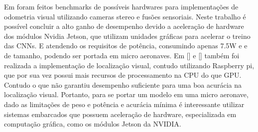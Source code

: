 Em \cite{jeon2021run} foram feitos benchmarks de possíveis hardwares para implementações de odometria visual utilizando cameras stereo e fusões sensoriais. Neste trabalho é possível concluir a alto ganho de desempenho devido a aceleração de hardware dos módulos Nvidia Jetson, que utilizam unidades gráficas para acelerar o treino das CNNs. E atendendo os requisitos de potência, consumindo apenas 7.5W e e de tamanho, podendo ser portada em micro aeronaves.  Em [] e [] também foi realizada a implementação de localização visual, contudo utilizando Raspberry pi, que por sua vez possui mais recursos de processamento na CPU do que GPU. Contudo  o que não garantiu desempenho suficiente para uma boa acurácia na localização visual. Portanto, para se portar um modelo em uma micro aeronave, dado as limitações de peso e potência e acurácia mínima é interessante utilizar sistemas embarcados que possuem aceleração de hardware, especializada em computação gráfica, como os módulos Jetson da NVIDIA.
